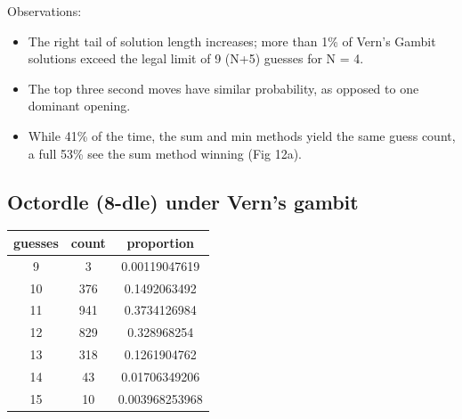 \documentclass[11pt, oneside]{article} 	%
\begin{document}
Observations:
\begin{itemize}
\item The right tail of solution length increases; more than 1\% of Vern's Gambit solutions exceed the legal limit of 9 (N+5) guesses for N = 4.
\item The top three second moves have similar probability, as opposed to one dominant opening.
\item While 41\% of the time, the sum and min methods yield the same guess count, a full 53\% see the sum method winning (Fig 12a).  
\end{itemize}

\subsection{Octordle (8-dle) under Vern's gambit}

\begin{center}
\begin{tabular}{ |c|c|c| }
 \hline
guesses & count & proportion \\
 \hline
9 & 3 & 0.00119047619 \\
10 & 376 & 0.1492063492 \\
11 & 941 & 0.3734126984 \\
12 & 829 & 0.328968254 \\
13 & 318 & 0.1261904762 \\
14 & 43 & 0.01706349206 \\
15 & 10 & 0.003968253968 \\
 \hline
\end{tabular}
\end{center}
\end{document}
